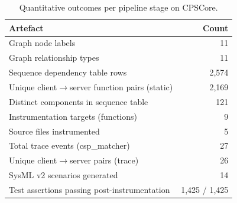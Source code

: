 \begin{table}[htb]
\centering
\caption{Quantitative outcomes per pipeline stage on CPSCore.}
\label{tab:impl-summary}
\begin{tabular}{@{} l r @{}}
\toprule
\textbf{Artefact} & \textbf{Count} \\
\midrule
Graph node labels                            & 11 \\
Graph relationship types                     & 11 \\
Sequence dependency table rows               & 2,574 \\
Unique client$\to$server function pairs (static) & 2,169 \\
Distinct components in sequence table        & 121 \\
Instrumentation targets (functions)          & 9 \\
Source files instrumented                    & 5 \\
Total trace events (csp\_matcher)             & 27 \\
Unique client$\to$server pairs (trace)        & 26 \\
SysML v2 scenarios generated                 & 14 \\
Test assertions passing post-instrumentation & 1,425 / 1,425 \\
\bottomrule
\end{tabular}
\end{table}
